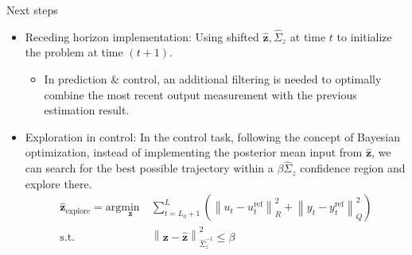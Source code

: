 \documentclass[smaller,aspectratio=169]{beamer}        %
\newcommand{\norm}[1]{\left\lVert#1\right\rVert}
\begin{document}
\begin{frame}{Next steps}
    \begin{itemize}
        \item \alert{Receding horizon implementation:} Using shifted $\hat{\mathbf{z}},\hat{\Sigma}_z$ at time $t$ to initialize the problem at time $(t+1)$.
        \begin{itemize}
            \item In prediction \& control, an additional filtering is needed to optimally combine the most recent output measurement with the previous estimation result.
        \end{itemize}
        
        \vspace{1em}
        \item \alert{Exploration in control:} In the control task, following the concept of Bayesian optimization, instead of implementing the posterior mean input from $\hat{\mathbf{z}}$, we can search for the best possible trajectory within a $\beta\hat{\Sigma}_z$ confidence region and explore there.
        \begin{align*}
            \hat{\mathbf{z}}_\text{explore}=\mathrm{arg}\underset{\mathbf{z}}{\mathrm{min}}&\ \sum_{t=L_0+1}^L\left(\norm{u_t-u_t^\mathrm{ref}}_R^2+\norm{y_t-y_t^\mathrm{ref}}_Q^2\right)\\
            \text{s.t.}&\ \norm{\mathbf{z}-\hat{\mathbf{z}}}_{\hat{\Sigma}_z^{-1}}^2\leq\beta
        \end{align*}
    \end{itemize}
\end{frame}
\end{document}
